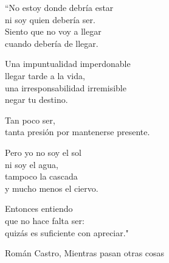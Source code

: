 \begin{dedication}
``No estoy donde debría estar\\
ni soy quien debería ser.\\
Siento que no voy a llegar\\
cuando debería de llegar.



Una impuntualidad imperdonable\\
llegar tarde a la vida,\\
una irresponsabilidad irremisible\\
negar tu destino.



Tan poco ser,\\
tanta presión por mantenerse presente.



Pero yo no soy el sol\\
ni soy el agua,\\
tampoco la cascada\\
y mucho menos el ciervo.



Entonces entiendo\\
que no hace falta ser:\\
quizás es suficiente con apreciar."

Román Castro, Mientras pasan otras cosas
\end{dedication}
